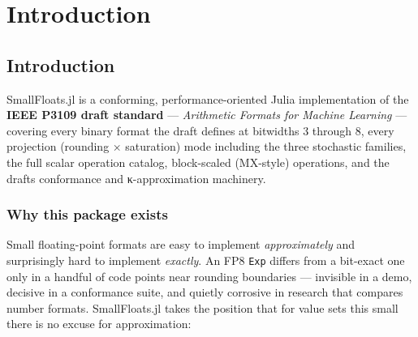 \part{Introduction}


\chapter{Introduction}



\label{16879307210612674453}{}


SmallFloats.jl is a conforming, performance-oriented Julia implementation of the \textbf{IEEE P3109 draft standard} — \emph{Arithmetic Formats for Machine Learning} — covering every binary format the draft defines at bitwidths 3 through 8, every projection (rounding × saturation) mode including the three stochastic families, the full scalar operation catalog, block-scaled ({\textquotedbl}MX-style{\textquotedbl}) operations, and the draft{\textquotesingle}s conformance and κ-approximation machinery.



\section{Why this package exists}



\label{13660426995343544750}{}


Small floating-point formats are easy to implement \emph{approximately} and surprisingly hard to implement \emph{exactly}. An FP8 \texttt{Exp} differs from a bit-exact one only in a handful of code points near rounding boundaries — invisible in a demo, decisive in a conformance suite, and quietly corrosive in research that compares number formats. SmallFloats.jl takes the position that for value sets this small there is no excuse for approximation:



